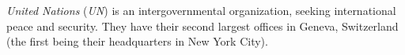 \emph{United Nations} (\emph{UN}) is an intergovernmental organization, seeking international peace and security.
They have their second largest offices in Geneva, Switzerland (the first being their headquarters in New York City).
